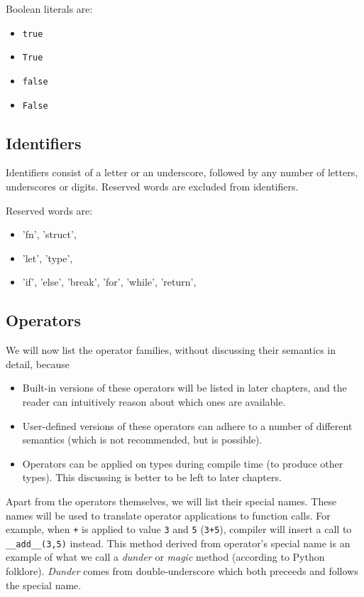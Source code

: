 \documentclass[times, utf8, diplomski]{fer}
\theoremstyle{definition}
\begin{document}
Boolean literals are:

\begin{itemize}
    \item \texttt{true}
    \item \texttt{True}
    \item \texttt{false}
    \item \texttt{False}
\end{itemize}

\subsection{Identifiers}

Identifiers consist of a letter or an underscore, followed by any number of letters, underscores or digits.
Reserved words are excluded from identifiers.

Reserved words are:
\begin{itemize}
    \item 'fn', 'struct',
    \item 'let', 'type',
    \item 'if', 'else', 'break', 'for', 'while', 'return',
\end{itemize}


\subsection{Operators}

We will now list the operator families, without discussing their semantics in detail, because

\begin{itemize}
    \item Built-in versions of these operators will be listed in later chapters, and the reader
        can intuitively reason about which ones are available.
    \item User-defined versions of these operators can adhere to a number of different semantics 
        (which is not recommended, but is possible).
    \item Operators can be applied on types during compile time (to produce other types). 
        This discussing is better to be left to later chapters.
\end{itemize}

Apart from the operators themselves, we will list their special names. These names
will be used to translate operator applications to function calls. For example, when 
\texttt{+} is applied to value \texttt{3} and \texttt{5} (\texttt{3+5}), compiler
will insert a call to \texttt{\_\_add\_\_(3,5)} instead. This method derived from operator's special name
is an example of what we call a \textit{dunder} or \textit{magic} method (according to Python folklore).
\textit{Dunder} comes from double-underscore which both preceeds and follows the special name.
\end{document}
